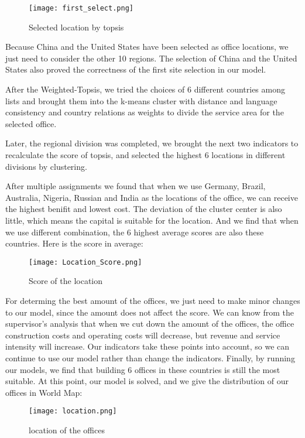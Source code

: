 \documentclass[12pt]{article}  %
\begin{document}
\begin{figure}[H]
	\centering
	\texttt{[image: first\_select.png]}
	\caption{Selected location by topsis}\label{fig:first_select}
\end{figure}
Because China and the United States have been selected as office locations, we just need to consider the other 10 regions. The selection of China and the United States also proved the correctness of the first site selection in our model.

After the Weighted-Topsis, we tried the choices of 6 different countries among lists and brought them into the k-means cluster with distance and language consistency and country relations as weights to divide the service area for the selected office. 

Later, the regional division was completed, we brought the next two indicators to recalculate the score of topsis, and selected the highest 6 locations in different divisions by clustering. 

After multiple assignments we found that when we use Germany, Brazil, Australia, Nigeria, Russian and India as the locations of the office, we can receive the highest benifit and lowest cost. The deviation of the cluster center is also little, which means the capital is suitable for the location. And we find that when we use different combination, the 6 highest average scores are also these countries. Here is the score in average:
\begin{figure}[H]
	\centering
	\texttt{[image: Location\_Score.png]}
	\caption{Score of the location}\label{fig:location}
\end{figure}

For determing the best amount of the offices, we just need to make minor changes to our model, since the amount does not affect the score. We can know from the supervisor's analysis that when we cut down the amount of the offices, the office construction costs and operating costs will decrease, but revenue and service intensity will increase. Our indicators take these points into account, so we can continue to use our model rather than change the indicators. Finally, by running our models, we find that building 6 offices in these countries is still the most suitable. At this point, our model is solved, and we give the distribution of our offices in World Map:
\begin{figure}[H]
	\centering
	\texttt{[image: location.png]}
	\caption{location of the offices}\label{fig:offices}
\end{figure}
\end{document}
